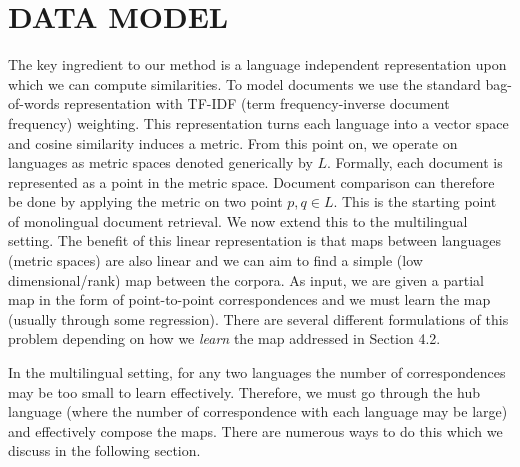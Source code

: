 \documentclass[twocolumn, draft]{article}
\begin{document}
\section{DATA MODEL}
\vspace{-0.2cm}
The key ingredient to our method is a language independent
representation upon which we can compute similarities. To model
documents we use the standard bag-of-words representation with
TF-IDF (term frequency-inverse document frequency) weighting.
This representation turns each language into a vector space and
cosine similarity induces a metric. From this point on, we
operate on languages as metric spaces denoted generically by $L$.
Formally, each document is represented as a point in the metric
space. Document comparison can therefore be done by applying the
metric on two point $p,q \in L$.
This is the starting point of monolingual document retrieval. We
now extend this to the multilingual setting. The benefit of this
linear representation is that maps between languages (metric
spaces) are also linear and we can aim to find a simple (low
dimensional/rank) map between the corpora. As input, we are given
a partial map in the form of point-to-point correspondences and
we must learn the map (usually through some regression).
There are several different formulations of this problem
depending on how we \emph{learn} the map addressed in Section 4.2.

In the multilingual setting, for any two languages the number of
correspondences may be too small to learn effectively. Therefore,
we must go through the hub language (where the number of
correspondence with each language may be large) and effectively
compose the maps. There are numerous ways to do this which we
discuss in the following section.
\end{document}
